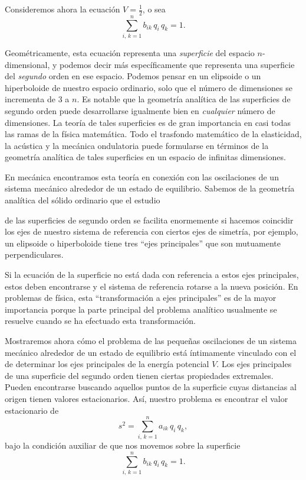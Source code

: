 \documentclass[12pt,a4paper]{book}
\begin{document}
Consideremos ahora la ecuación $V = \frac{1}{2}$, o sea
\begin{equation}
\sum_{i,\,k=1}^{n} b_{ik}\,q_i\,q_k = 1. \tag{510.15}
\end{equation}

Geométricamente, esta ecuación representa una \textit{superficie} del espacio $n$-dimensional, y podemos decir más específicamente que representa una superficie del \textit{segundo} orden en ese espacio. Podemos pensar en un elipsoide o un hiperboloide de nuestro espacio ordinario, solo que el número de dimensiones se incrementa de 3 a $n$. Es notable que la geometría analítica de las superficies de segundo orden puede desarrollarse igualmente bien en \textit{cualquier} número de dimensiones. La teoría de tales superficies es de gran importancia en casi todas las ramas de la física matemática. Todo el trasfondo matemático de la elasticidad, la acústica y la mecánica ondulatoria puede formularse en términos de la geometría analítica de tales superficies en un espacio de infinitas dimensiones.

En mecánica encontramos esta teoría en conexión con las oscilaciones de un sistema mecánico alrededor de un estado de equilibrio. Sabemos de la geometría analítica del sólido ordinario que el estudio


de las superficies de segundo orden se facilita enormemente si hacemos coincidir los ejes de nuestro sistema de referencia con ciertos ejes de simetría, por ejemplo, un elipsoide o hiperboloide tiene tres ``ejes principales'' que son mutuamente perpendiculares.

Si la ecuación de la superficie no está dada con referencia a estos ejes principales, estos deben encontrarse y el sistema de referencia rotarse a la nueva posición. En problemas de física, esta ``transformación a ejes principales'' es de la mayor importancia porque la parte principal del problema analítico usualmente se resuelve cuando se ha efectuado esta transformación.

Mostraremos ahora cómo el problema de las pequeñas oscilaciones de un sistema mecánico alrededor de un estado de equilibrio está íntimamente vinculado con el de determinar los ejes principales de la energía potencial $V$. Los ejes principales de una superficie del segundo orden tienen ciertas propiedades extremales. Pueden encontrarse buscando aquellos puntos de la superficie cuyas distancias al origen tienen valores estacionarios. Así, nuestro problema es encontrar el valor estacionario de
\begin{equation}
s^2 = \sum_{i,\,k=1}^{n} a_{ik}\,q_i\,q_k, \tag{510.16}
\end{equation}
bajo la condición auxiliar de que nos movemos sobre la superficie
\begin{equation}
\sum_{i,\,k=1}^{n} b_{ik}\,q_i\,q_k = 1. \tag{510.17}
\end{equation}
\end{document}
